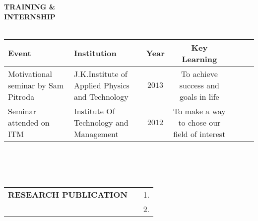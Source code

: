 \documentclass[10pt]{article}
\begin{document}
		\textbf{TRAINING \& \\ INTERNSHIP}\\ \\
		\begin{tabular}{|p{1in}|p{2in}|c|c|p{1in}|c|l|}
			\hline
			\textbf{Event} & \textbf{Institution} & \textbf{Year} & \textbf{Key Learning}\\
			\hline 
			
			Motivational seminar by Sam Pitroda & J.K.Institute of Applied Physics and Technology & $2013$ & To achieve success and goals in life\\
			Seminar attended on ITM & Institute Of Technology and Management & $2012$ & To make a way to chose our field of interest\\
			\hline
		\end{tabular} \\ \\ \\
		\begin{tabular}{l c l}
			\textbf{RESEARCH PUBLICATION} & &  1.\\
			& &  2.
		\end{tabular}
	
\end{document}
